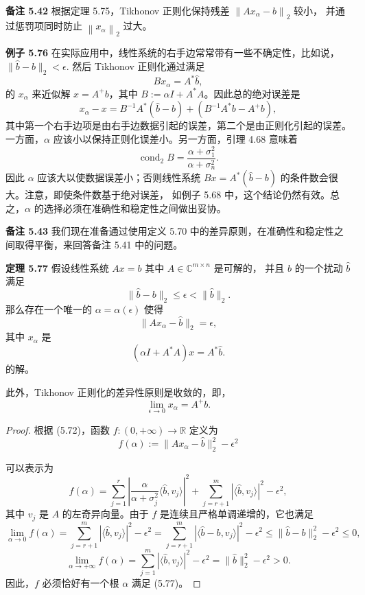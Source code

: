 \documentclass[a4paper]{ctexart}
\begin{document}
{\noindent \textbf{备注 5.42 } 根据定理 5.75，Tikhonov 正则化保持残差 \(\left\|A x_\alpha - b\right\|_2\) 较小，
并通过惩罚项同时防止 \(\left\|x_\alpha\right\|_2\) 过大。

\noindent \textbf{例子 5.76 } 在实际应用中，线性系统的右手边常常带有一些不确定性，比如说，\(\|\hat{b} - b\|_2 < \epsilon\). 
然后 Tikhonov 正则化通过满足
\[
  B x_\alpha = A^* \hat{b},
\]
的 \(x_\alpha\) 来近似解 \(x = A^+ b\)，其中 \(B := \alpha I + A^* A\)。因此总的绝对误差是
\[
  x_\alpha - x = B^{-1} A^* (\hat{b} - b) + \left(B^{-1} A^* b - A^+ b\right),
\]
其中第一个右手边项是由右手边数据引起的误差，第二个是由正则化引起的误差。一方面，\(\alpha\) 应该小以保持正则化误差小。另一方面，引理 4.68 意味着
\[
  \operatorname{cond}_2 B = \frac{\alpha + \sigma_1^2}{\alpha + \sigma_n^2}.
\]
因此 \(\alpha\) 应该大以使数据误差小；否则线性系统 \(B x = A^* (\hat{b} - b)\) 的条件数会很大。注意，即使条件数基于绝对误差，
如例子 5.68 中，这个结论仍然有效。总之，\(\alpha\) 的选择必须在准确性和稳定性之间做出妥协。

\noindent \textbf{备注 5.43 } 我们现在准备通过使用定义 5.70 中的差异原则，在准确性和稳定性之间取得平衡，来回答备注 5.41 中的问题。

\noindent \textbf{定理 5.77 } 假设线性系统 \(Ax = b\) 其中 \(A \in \mathbb{C}^{m \times n}\) 是可解的，
并且 \(b\) 的一个扰动 \(\hat{b}\) 满足
\[
  \|\hat{b} - b\|_2 \leq \epsilon < \|\hat{b}\|_2. \tag{5.76}
\]
那么存在一个唯一的 \(\alpha = \alpha(\epsilon)\) 使得
\[
  \|A x_\alpha - \hat{b}\|_2 = \epsilon, \tag{5.77}
\]
其中 \(x_\alpha\) 是
\[
  (\alpha I + A^*A)x = A^*\hat{b}. \tag{5.78}
\]
的解。

此外，Tikhonov 正则化的差异性原则是收敛的，即，
\[
  \lim_{\epsilon \to 0} x_\alpha = A^+b. \tag{5.79}
\]

\begin{proof}
根据 (5.72)，函数 \(f: (0, +\infty) \to \mathbb{R}\) 定义为
\[
  f(\alpha) := \|A x_\alpha - \hat{b}\|_2^2 - \epsilon^2
\]

可以表示为
\[
  f(\alpha) = \sum_{j=1}^r \left|\frac{\alpha}{\alpha + \sigma_j^2} \langle \hat{b}, v_j \rangle\right|^2 + \sum_{j=r+1}^m \left|\langle \hat{b}, v_j \rangle\right|^2 - \epsilon^2,
\]
其中 \(v_j\) 是 \(A\) 的左奇异向量。由于 \(f\) 是连续且严格单调递增的，它也满足
\[
  \lim_{\alpha \to 0} f(\alpha) = \sum_{j=r+1}^m \left|\langle \hat{b}, v_j \rangle\right|^2 - \epsilon^2 = \sum_{j=r+1}^m \left|\langle \hat{b} - b, v_j \rangle\right|^2 - \epsilon^2 \leq \|\hat{b} - b\|_2^2 - \epsilon^2 \leq 0,
\]
\[
  \lim_{\alpha \to +\infty} f(\alpha) = \sum_{j=1}^m \left|\langle \hat{b}, v_j \rangle\right|^2 - \epsilon^2 = \|\hat{b}\|_2^2 - \epsilon^2 > 0.
\]
因此，\(f\) 必须恰好有一个根 \(\alpha\) 满足 (5.77)。
  

\end{proof}}
\end{document}
